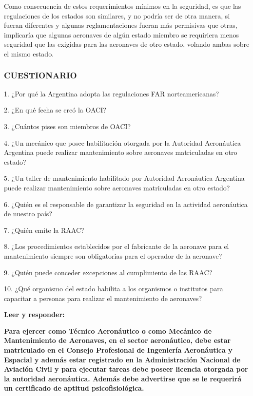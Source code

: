 Como consecuencia de estos requerimientos mínimos en la seguridad, es que las regulaciones de los estados son similares, y no podría ser de otra manera, si fueran diferentes y algunas reglamentaciones fueran más permisivas que otras, implicaría que algunas aeronaves de algún estado miembro se requiriera menos seguridad que las exigidas para las aeronaves de otro estado, volando ambas sobre el mismo estado.



\subsubsection*{CUESTIONARIO}
1. ¿Por qué la Argentina adopta las regulaciones FAR norteamericanas?

2. ¿En qué fecha se creó la OACI?

3. ¿Cuántos pises son miembros de OACI?

4. ¿Un mecánico que posee habilitación otorgada por la Autoridad Aeronáutica Argentina puede realizar mantenimiento sobre aeronaves matriculadas en otro estado?

5. ¿Un taller de mantenimiento habilitado por Autoridad Aeronáutica Argentina puede realizar mantenimiento sobre aeronaves matriculadas en otro estado?

6. ¿Quién es el responsable de garantizar la seguridad en la actividad aeronáutica de nuestro país?

7. ¿Quién emite la RAAC?

8. ¿Los procedimientos establecidos por el fabricante de la aeronave para el mantenimiento siempre son obligatorias para el operador de la aeronave?

9. ¿Quién puede conceder excepciones al cumplimiento de las RAAC?

10. ¿Qué organismo del estado habilita a los organismos o institutos para capacitar a personas para realizar el mantenimiento de aeronaves?

\textbf{Leer y responder:}

\textbf{Para ejercer como Técnico Aeronáutico o como Mecánico de Mantenimiento de Aeronaves, en el} \textbf{sector aeronáutico, debe estar matriculado en el Consejo Profesional de Ingeniería Aeronáutica y} \textbf{Espacial y además estar registrado en la Administración Nacional de Aviación Civil y para ejecutar} \textbf{tareas debe poseer licencia otorgada por la autoridad aeronáutica. Además debe advertirse que se} \textbf{le requerirá un certificado de aptitud psicofisiológica.}

